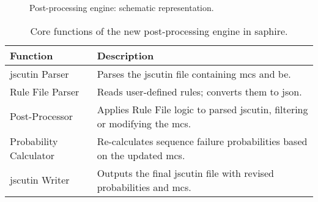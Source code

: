 \usetikzlibrary{positioning,arrows.meta}
\begin{figure}[h]
  \centering
  \caption{Post-processing engine: schematic representation.}
  \label{fig:postproc-engine-schematic}
\end{figure}

\begin{table}[h]
\centering 
\caption{Core functions of the new post-processing engine in \acrshort{saphire}.}
\begin{tabular}{@{}ll@{}}
\toprule
\textbf{Function}                  & \textbf{Description}                                                                                             \\ 
\midrule
\acrshort{jscutin} Parser                & Parses the \acrshort{jscutin} file containing \acrshort{mcs} and \acrlong{be}.                                  \\
Rule File Parser                   & Reads user-defined rules; converts them to \acrshort{json}.                              \\
Post-Processor                     & Applies Rule File logic to parsed \acrshort{jscutin}, filtering or modifying the \acrshort{mcs}.                   \\
Probability Calculator             & Re-calculates sequence failure probabilities based on the updated \acrshort{mcs}.                                     \\
\acrshort{jscutin} Writer                     & Outputs the final \acrshort{jscutin} file with revised probabilities and \acrshort{mcs}.                                \\ 
\bottomrule
\end{tabular}
\label{tab:coreFunctions}
\end{table}

